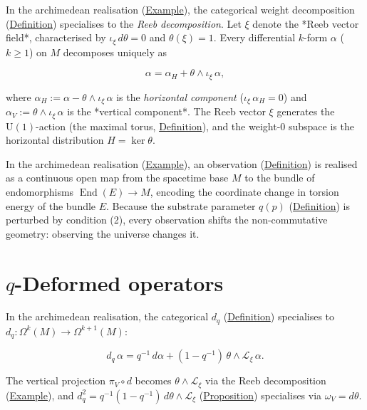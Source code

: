 \begin{example}
  \label{ex:reeb-decomposition}
In the archimedean realisation
(\hyperref[def:c-quantum-universe]{Example}), the categorical weight
decomposition (\hyperref[def:weight-decomposition]{Definition}) specialises
to the \emph{Reeb decomposition}.  Let $\xi$ denote the *Reeb
vector field*, characterised by $\iota_\xi\,d\theta = 0$ and
$\theta(\xi) = 1$.  Every differential $k$-form $\alpha$ ($k \geq 1$)
on $M$ decomposes uniquely as

\[
\alpha = \alpha_H + \theta \wedge \iota_\xi\,\alpha,
\]

where $\alpha_H := \alpha - \theta \wedge \iota_\xi\,\alpha$ is the
\emph{horizontal component} ($\iota_\xi\,\alpha_H = 0$) and
$\alpha_V := \theta \wedge \iota_\xi\,\alpha$ is the *vertical
component*.  The Reeb vector $\xi$ generates the
$\mathrm{U}(1)$-action (the maximal torus,
\hyperref[def:maximal-torus]{Definition}), and the weight-$0$ subspace is the
horizontal distribution $H = \ker\theta$.
\end{example}

\begin{remark}
  \label{rem:observation-archimedean}
In the archimedean realisation
(\hyperref[def:c-quantum-observable-universe]{Example}), an observation
(\hyperref[def:observation]{Definition}) is realised as a continuous open map
from the spacetime base $M$ to the bundle of endomorphisms
$\operatorname{End}(E) \to M$, encoding the coordinate change in torsion
energy of the bundle $E$.  Because the substrate parameter $q(p)$
(\hyperref[def:substrate-parameter]{Definition}) is perturbed by
condition (2), every observation shifts the non-commutative geometry:
observing the universe changes it.
\end{remark}

\section{$q$-Deformed operators}
\label{sec:q-deformed-operators}

\begin{example}
  \label{ex:q-ext-deriv}
In the archimedean realisation, the categorical $d_q$
(\hyperref[def:categorical-q-ext-deriv]{Definition}) specialises to
$d_q \colon \Omega^k(M) \to \Omega^{k+1}(M)$:

\[
d_q\,\alpha
  = q^{-1}\,d\alpha
        + (1 - q^{-1})\,\theta \wedge \mathcal{L}_\xi\,\alpha.
\]

The vertical projection $\pi_V \circ d$ becomes
$\theta \wedge \mathcal{L}_\xi$ via the Reeb decomposition
(\hyperref[def:reeb-decomposition]{Example}), and
$d_q^2 = q^{-1}(1-q^{-1})\,d\theta \wedge \mathcal{L}_\xi$
(\hyperref[prop:categorical-dq-squared]{Proposition}) specialises via
$\omega_V = d\theta$.
\end{example}

